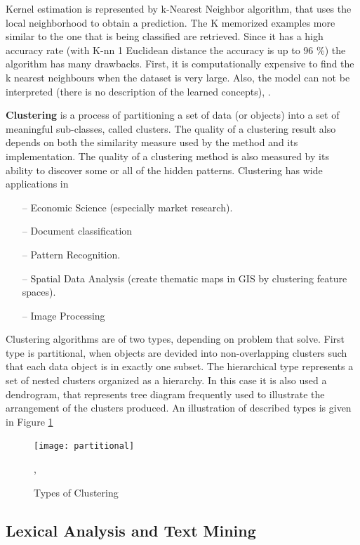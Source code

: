 Kernel estimation is represented by k-Nearest Neighbor algorithm, that uses the local neighborhood to obtain a prediction. The K memorized examples more similar to the one that is being classified are retrieved. Since it has a high accuracy rate (with K-nn 1 Euclidean distance the accuracy is up to 96 \%) the algorithm has many drawbacks. First, it is computationally expensive to find the k nearest neighbours when the dataset is very large. Also, the model can not be interpreted (there is no description of the learned concepts), \cite{k-neighbor}.

\textbf{Clustering} is a process of partitioning a set of data (or objects) into a set of meaningful sub-classes, called clusters. The quality of a clustering result also depends on both the similarity measure used by the method and its implementation. The quality of a clustering method is also measured by its ability to discover some or all of the hidden patterns. Clustering has wide applications in

\begin{itemize}
\item[--] Economic Science (especially market research).
\item[--] Document classification
\item[--] Pattern Recognition.
\item[--] Spatial Data Analysis (create thematic maps in GIS by clustering feature spaces).
\item[--] Image Processing
\end{itemize}

Clustering algorithms are of two types, depending on problem that solve. First type is partitional, when objects are devided into non-overlapping clusters such that each data object is in exactly one subset. The hierarchical type represents a set of nested clusters organized as a hierarchy. In this case it is also used a dendrogram, that represents tree diagram frequently used to illustrate the arrangement of the clusters produced. An illustration of described types is given in Figure \ref{types}

\begin{figure}[!ht]
\centering
\texttt{[image: partitional]}
\caption{Types of Clustering}\label{types}, \cite{typescluster}
\end{figure}

\subsection{Lexical Analysis and Text Mining} \label{ssec:lexical}

